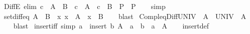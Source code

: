 \begin{isabellebody}
{\isafoldproof}%
%
\isadelimproof
\isanewline
%
\endisadelimproof
\isanewline
{}\isamarkupfalse%
\ DiffE\ {\isacharbrackleft}{\kern0pt}elim{\isacharbang}{\kern0pt}{\isacharbrackright}{\kern0pt}{\isacharcolon}{\kern0pt}\ {\isachardoublequoteopen}c\ {\isasymin}\ A\ {\isacharminus}{\kern0pt}\ B\ {\isasymLongrightarrow}\ {\isacharparenleft}{\kern0pt}c\ {\isasymin}\ A\ {\isasymLongrightarrow}\ c\ {\isasymnotin}\ B\ {\isasymLongrightarrow}\ P{\isacharparenright}{\kern0pt}\ {\isasymLongrightarrow}\ P{\isachardoublequoteclose}\isanewline
%
\isadelimproof
\ \ %
\endisadelimproof
%
\isatagproof
{}\isamarkupfalse%
\ simp%
\endisatagproof
{\isafoldproof}%
%
\isadelimproof
\isanewline
%
\endisadelimproof
\isanewline
{}\isamarkupfalse%
\ set{\isacharunderscore}{\kern0pt}diff{\isacharunderscore}{\kern0pt}eq{\isacharcolon}{\kern0pt}\ {\isachardoublequoteopen}A\ {\isacharminus}{\kern0pt}\ B\ {\isacharequal}{\kern0pt}\ {\isacharbraceleft}{\kern0pt}x{\isachardot}{\kern0pt}\ x\ {\isasymin}\ A\ {\isasymand}\ x\ {\isasymnotin}\ B{\isacharbraceright}{\kern0pt}{\isachardoublequoteclose}\isanewline
%
\isadelimproof
\ \ %
\endisadelimproof
%
\isatagproof
{}\isamarkupfalse%
\ blast%
\endisatagproof
{\isafoldproof}%
%
\isadelimproof
\isanewline
%
\endisadelimproof
\isanewline
{}\isamarkupfalse%
\ Compl{\isacharunderscore}{\kern0pt}eq{\isacharunderscore}{\kern0pt}Diff{\isacharunderscore}{\kern0pt}UNIV{\isacharcolon}{\kern0pt}\ {\isachardoublequoteopen}{\isacharminus}{\kern0pt}\ A\ {\isacharequal}{\kern0pt}\ {\isacharparenleft}{\kern0pt}UNIV\ {\isacharminus}{\kern0pt}\ A{\isacharparenright}{\kern0pt}{\isachardoublequoteclose}\isanewline
%
\isadelimproof
\ \ %
\endisadelimproof
%
\isatagproof
{}\isamarkupfalse%
\ blast%
\endisatagproof
{\isafoldproof}%
%
\isadelimproof
%
\endisadelimproof
%
\isadelimdocument
%
\endisadelimdocument
%
\isatagdocument
%
\isamarkuptrue%
%
\endisatagdocument
{\isafolddocument}%
%
\isadelimdocument
%
\endisadelimdocument
{}\isamarkupfalse%
\ insert{\isacharunderscore}{\kern0pt}iff\ {\isacharbrackleft}{\kern0pt}simp{\isacharbrackright}{\kern0pt}{\isacharcolon}{\kern0pt}\ {\isachardoublequoteopen}a\ {\isasymin}\ insert\ b\ A\ {\isasymlongleftrightarrow}\ a\ {\isacharequal}{\kern0pt}\ b\ {\isasymor}\ a\ {\isasymin}\ A{\isachardoublequoteclose}\isanewline
%
\isadelimproof
\ \ %
\endisadelimproof
%
\isatagproof
{}\isamarkupfalse%
\ insert{\isacharunderscore}{\kern0pt}def\ \isamarkupfalse%

\end{isabellebody}
